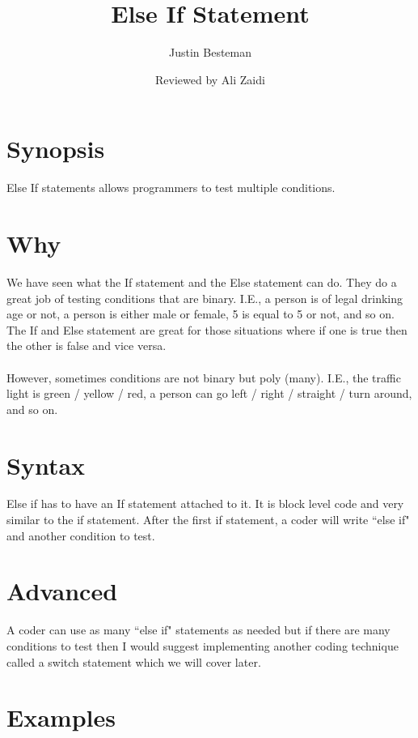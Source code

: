 \documentclass[12pt, letterpaper]{article}
\title{Else If Statement}
\author{Justin Besteman}
\date{Reviewed by Ali Zaidi}
\begin{document}
\maketitle


\section*{Synopsis}

Else If statements allows programmers to test multiple conditions.

\section*{Why}

We have seen what the If statement and the Else statement can do. They do a great job of testing conditions that are binary. I.E., a person is of legal drinking age or not, a person is either male or female, 5 is equal to 5 or not, and so on. The If and Else statement are great for those situations where if one is true then the other is false and vice versa. \\ \\
However, sometimes conditions are not binary but poly (many). I.E., the traffic light is green / yellow / red, a person can go left / right / straight / turn around, and so on. \\

\section*{Syntax}

Else if has to have an If statement attached to it. It is block level code and very similar to the if statement. After the first if statement, a coder will write ``else if" and another condition to test.

\section*{Advanced}

A coder can use as many ``else if" statements as needed but if there are many conditions to test then I would suggest implementing another coding technique called a switch statement which we will cover later.

\section*{Examples}
\end{document}
